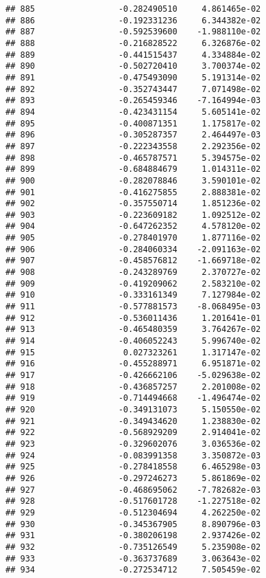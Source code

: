 \documentclass[
]{article}
\begin{document}
\begin{verbatim}
## 885                 -0.282490510     4.861465e-02
## 886                 -0.192331236     6.344382e-02
## 887                 -0.592539600    -1.988110e-02
## 888                 -0.216828522     6.326876e-02
## 889                 -0.441515437     4.334884e-02
## 890                 -0.502720410     3.700374e-02
## 891                 -0.475493090     5.191314e-02
## 892                 -0.352743447     7.071498e-02
## 893                 -0.265459346    -7.164994e-03
## 894                 -0.423431154     5.605141e-02
## 895                 -0.400871351     1.175817e-02
## 896                 -0.305287357     2.464497e-03
## 897                 -0.222343558     2.292356e-02
## 898                 -0.465787571     5.394575e-02
## 899                 -0.684884679     1.014311e-02
## 900                 -0.282078846     3.590101e-02
## 901                 -0.416275855     2.888381e-02
## 902                 -0.357550714     1.851236e-02
## 903                 -0.223609182     1.092512e-02
## 904                 -0.647262352     4.578120e-02
## 905                 -0.278401970     1.877116e-02
## 906                 -0.284060334    -2.091163e-02
## 907                 -0.458576812    -1.669718e-02
## 908                 -0.243289769     2.370727e-02
## 909                 -0.419209062     2.583210e-02
## 910                 -0.333161349     7.127984e-02
## 911                 -0.577881573    -8.068495e-03
## 912                 -0.536011436     1.201641e-01
## 913                 -0.465480359     3.764267e-02
## 914                 -0.406052243     5.996740e-02
## 915                  0.027323261     1.317147e-02
## 916                 -0.455288971     6.951871e-02
## 917                 -0.426662106    -5.029638e-02
## 918                 -0.436857257     2.201008e-02
## 919                 -0.714494668    -1.496474e-02
## 920                 -0.349131073     5.150550e-02
## 921                 -0.349434620     1.238830e-02
## 922                 -0.568929209     2.914041e-02
## 923                 -0.329602076     3.036536e-02
## 924                 -0.083991358     3.350872e-03
## 925                 -0.278418558     6.465298e-03
## 926                 -0.297246273     5.861869e-02
## 927                 -0.468695062    -7.782682e-03
## 928                 -0.517601728    -1.227518e-02
## 929                 -0.512304694     4.262250e-02
## 930                 -0.345367905     8.890796e-03
## 931                 -0.380206198     2.937426e-02
## 932                 -0.735126549     5.235908e-02
## 933                 -0.363737689     3.063643e-02
## 934                 -0.272534712     7.505459e-02

\end{verbatim}
\end{document}

